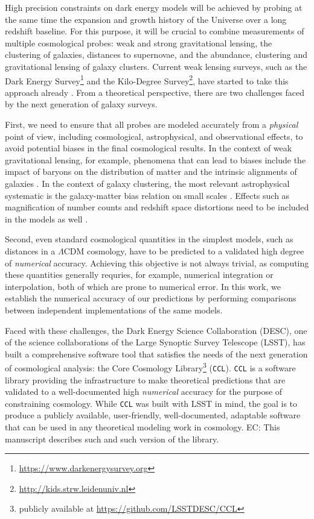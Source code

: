 \documentclass[\docopts]{\docclass}
\newcommand{\elisa}[1]{\textcolor{green!10!orange!90!}{EC: #1}}
\newcommand{\ccl}{{\tt CCL}\xspace}
\begin{document}
High precision constraints on dark energy models will be achieved by probing at the same time the expansion and growth history of the Universe over a long redshift baseline. For this purpose, it will be crucial to combine measurements of multiple cosmological probes: weak and strong gravitational lensing, the clustering of galaxies, distances to supernovae, and the abundance, clustering and gravitational lensing of galaxy clusters. Current weak lensing surveys, such as the Dark Energy Survey\footnote{\url{https://www.darkenergysurvey.org}} and the Kilo-Degree Survey\footnote{\url{http://kids.strw.leidenuniv.nl}}, have started to take this approach already \citep{Joudaki18,vanUitert18,DEScombined,krause17}. From a theoretical perspective, there are two challenges faced by the next generation of galaxy surveys. 

First, we need to ensure that all probes are modeled accurately from a {\it physical} point of view, including cosmological, astrophysical, and observational effects, to avoid potential biases in the final cosmological results. In the context of weak gravitational lensing, for example, phenomena that can lead to biases include the impact of baryons on the distribution of matter and the intrinsic alignments of galaxies \citep[e.g.][]{vanDaalen11,Semboloni11,Troxel14,Krause15,Blazek17}. In the context of galaxy clustering, the most relevant astrophysical systematic is the galaxy-matter bias relation on small scales \citep{2013MNRAS.436.2038Z,2016arXiv161109787D}. Effects such as magnification of number counts and redshift space distortions need to be included in the models as well \citep{Alonso15,ghosh18}. 

Second, even standard cosmological quantities in the simplest models, such as distances in a $\Lambda$CDM cosmology, have to be predicted to a validated high degree of {\it numerical} accuracy. Achieving this objective is not always trivial, as computing these quantities generally requries, for example, numerical integration or interpolation, both of which are prone to numerical error. In this work, we establish the numerical accuracy of our predictions by performing comparisons between independent implementations of the same models. 

Faced with these challenges, the Dark Energy Science Collaboration (DESC), one of the science collaborations of the Large Synoptic Survey Telescope (LSST), has built a comprehensive software tool that satisfies the needs of the next generation of cosmological analysis: the Core Cosmology Library\footnote{publicly available at \url{https://github.com/LSSTDESC/CCL}} (\ccl). \ccl is a software library providing the infrastructure to make theoretical predictions that are validated to a well-documented high {\it numerical} accuracy for the purpose of constraining cosmology. While \ccl was built with LSST in mind, the goal is to produce a publicly available, user-friendly, well-documented, adaptable software that can be used in any theoretical modeling work in cosmology. \elisa{This manuscript describes such and such version of the library.}
\end{document}
